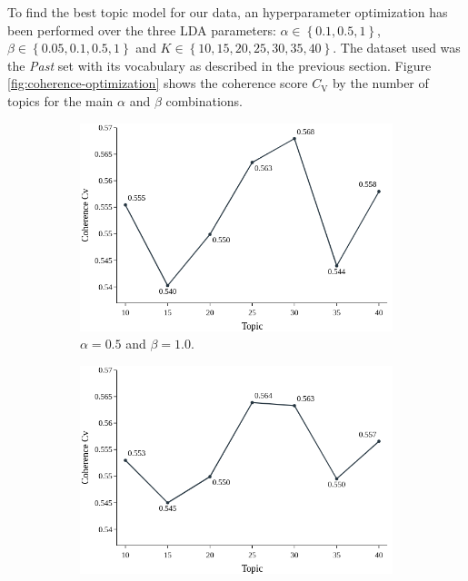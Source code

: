 To find the best topic model for our data, an hyperparameter optimization has been performed over the three LDA parameters: $\alpha \in \left\{0.1, 0.5, 1\right\}$, $\beta \in \left\{0.05, 0.1, 0.5, 1\right\}$ and $K \in \left\{10, 15, 20, 25, 30, 35, 40\right\}$. The dataset used was the \textit{Past} set with its vocabulary as described in the previous section. Figure \ref{fig:coherence-optimization} shows the coherence score $C_{\text{V}}$ by the number of topics for the main $\alpha$ and $\beta$ combinations.

\begin{figure}[h!]
	\begin{subfigure}{0.49\textwidth}
		\includegraphics[width=\linewidth]{01.Chapters/05.Results/01_Topic_Cv_A:0.5| B:1.00}
		\caption{$\alpha = 0.5$ and $\beta = 1.0$.}
	\end{subfigure}%
	\hfill
	\begin{subfigure}{0.49\textwidth}
		\includegraphics[width=\linewidth]{01.Chapters/05.Results/02_Topic_Cv_A:0.1| B:1.00}

\end{subfigure}
\end{figure}
